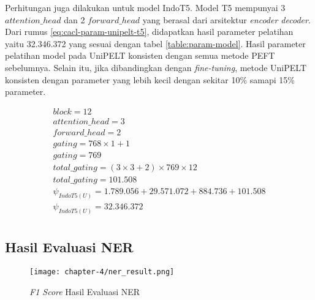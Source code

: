 Perhitungan juga dilakukan untuk model IndoT5. Model T5 mempunyai 3 $attention\_head$ dan 2 $forward\_head$ yang berasal dari arsitektur \textit{encoder decoder}. Dari rumus \ref{eq:cacl-param-unipelt-t5}, didapatkan hasil parameter pelatihan yaitu 32.346.372 yang sesuai dengan tabel \ref{table:param-model}. Hasil parameter pelatihan model pada UniPELT konsisten dengan semua metode PEFT sebelumnya. Selain itu, jika dibandingkan dengan \textit{fine-tuning}, metode UniPELT konsisten dengan parameter yang lebih kecil dengan sekitar 10\% samapi 15\% parameter.

\begin{equation}
    \begin{aligned}
        block = 12 \\
        attention\_head = 3 \\
        forward\_head = 2 \\
        gating = 768 \times 1 + 1 \\
        gating = 769 \\
        total\_gating = (3 \times 3 + 2) \times 769 \times 12 \\
        total\_gating =  101.508 \\
        \psi_{IndoT5(U)} = 1.789.056 + 29.571.072 + 884.736 + 101.508 \\
        \psi_{IndoT5(U)} = 32.346.372 \\
    \end{aligned}
    \label{eq:cacl-param-unipelt-t5}
\end{equation}

\subsection{Hasil Evaluasi NER}

\begin{figure}[h]
    \centering
    \centerline{\texttt{[image: chapter-4/ner\_result.png]}}
    \caption{\textit{F1 Score} Hasil Evaluasi NER}
    \label{fig:ner-result}
\end{figure}

